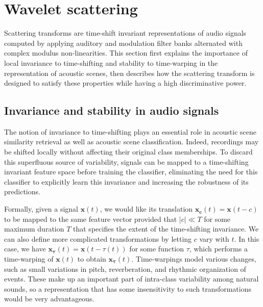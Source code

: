\documentclass[journal]{IEEEtran}
\newcommand{\gl}[1]{\textcolor{red}{Gr\'egoire : #1}}
\newcommand{\ja}[1]{\textcolor{magenta}{Joakim : #1}}
\begin{document}




\section{Wavelet scattering \label{sec:scattering}}

Scattering transforms are time-shift invariant representations of audio signals computed by applying auditory and modulation filter banks alternated with complex modulus non-linearities.
This section first explains the importance of local invariance to time-shifting and stability to time-warping in the representation of acoustic scenes, then describes how the scattering transform is designed to satisfy these properties while having a high discriminative power.

\subsection{Invariance and stability in audio signals}
The notion of invariance to time-shifting plays an essential role in acoustic scene similarity retrieval as well as acoustic scene classification.
Indeed, recordings may be shifted locally without affecting their original class memberships.
To discard this superfluous source of variability, signals can be mapped to a time-shifting invariant feature space before training the classifier, eliminating the need for this classifier to explicitly learn this invariance and increasing the robustness of its predictions.

Formally, given a signal $\boldsymbol{x}(t)$, we would like its translation $\boldsymbol{x_c}(t) = \boldsymbol{x}(t-c)$ to be mapped to the same feature vector provided that $|c| \ll T$ for some maximum duration $T$ that specifies the extent of the time-shifting invariance. We can also define more complicated transformations by letting $c$ vary with $t$. In this case, we have $\boldsymbol{x_\tau}(t) = \boldsymbol{x}(t-\tau(t))$ for some function $\tau$, which performs a time-warping of $\boldsymbol{x}(t)$ to obtain $\boldsymbol{x_\tau}(t)$. Time-warpings model various changes, such as small variations in pitch, reverberation, and rhythmic organization of events. These make up an important part of intra-class variability among natural sounds, so a representation that has some insensitivity to such transformations would be very advantageous.
\end{document}

